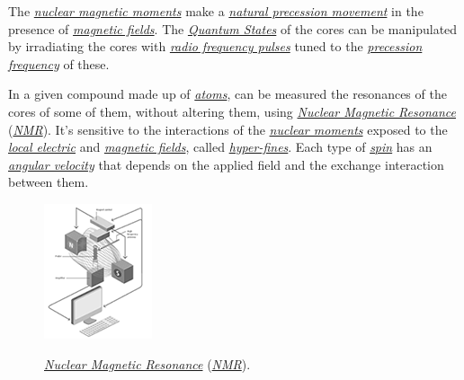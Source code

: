 \documentclass[conference]{IEEEtran}
\begin{document}
\vspace{4pt}

The \href{https://en.wikipedia.org/wiki/Nuclear_magnetic_moment}{\textit{nuclear magnetic moments}} make a \href{https://en.wikipedia.org/wiki/Precession}{\textit{natural precession movement}} in the presence of \href{https://en.wikipedia.org/wiki/Magnetic_field}{\textit{magnetic fields}}. The \href{https://en.wikipedia.org/wiki/Quantum_state}{\textit{Quantum States}} of the cores can be manipulated by irradiating the cores with \href{https://en.wikipedia.org/wiki/Radio_frequency}{\textit{radio frequency pulses}} tuned to the \href{https://en.wikipedia.org/wiki/Precession}{\textit{precession frequency}} of these.

\vspace{4pt}

In a given compound made up of \href{https://en.wikipedia.org/wiki/Atom}{\textit{atoms}}, can be measured the resonances of the cores of some of them, without altering them, using \href{https://en.wikipedia.org/wiki/Nuclear_magnetic_resonance}{\textit{Nuclear Magnetic Resonance}} (\href{https://en.wikipedia.org/wiki/Nuclear_magnetic_resonance}{\textit{NMR}}). It's sensitive to the interactions of the \href{https://en.wikipedia.org/wiki/Nuclear_magnetic_moment}{\textit{nuclear moments}} exposed to the \href{https://en.wikipedia.org/wiki/Electric_field}{\textit{local electric}} and \href{https://en.wikipedia.org/wiki/Magnetic_field}{\textit{magnetic fields}}, called \href{https://en.wikipedia.org/wiki/Hyperfine_structure}{\textit{hyper-fines}}. Each type of \href{https://en.wikipedia.org/wiki/Spin_states_(d_electrons)}{\textit{spin}} has an \href{https://en.wikipedia.org/wiki/Angular_velocity}{\textit{angular velocity}} that depends on the applied field and the exchange interaction between them.

\begin{figure}[htbp]
\centerline{\href{https://en.wikipedia.org/wiki/Nuclear_magnetic_resonance}{\includegraphics{imgs/fig-6.png}}}
\caption{\href{https://en.wikipedia.org/wiki/Nuclear_magnetic_resonance}{\textit{Nuclear Magnetic Resonance}} (\href{https://en.wikipedia.org/wiki/Nuclear_magnetic_resonance}{\textit{NMR}}).}
\label{fig}
\end{figure}
\end{document}
